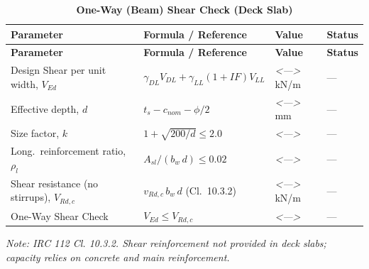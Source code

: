 \documentclass[12pt,a4paper]{report}
\numberwithin{table}{chapter}
\numberwithin{figure}{chapter}
\newcommand{\placeholder}[1]{\textit{\textless #1\textgreater}}
\begin{document}
\vspace{1em}
\begin{longtable}{|L{5.5cm}|C{3.5cm}|>{\centering\arraybackslash}p{4.5cm}|C{2cm}|}
\caption{\textbf{One-Way (Beam) Shear Check (Deck Slab)}}
\hline
{} \textbf{Parameter} & \textbf{Formula / Reference} & \textbf{Value} & \textbf{Status} \\[6pt]
\hline
\endfirsthead
\hline
{} \textbf{Parameter} & \textbf{Formula / Reference} & \textbf{Value} & \textbf{Status} \\[6pt]
\hline
\endhead
Design Shear per unit width, $V_{Ed}$ & $\gamma_{DL} V_{DL} + \gamma_{LL}(1{+}IF)V_{LL}$ & \placeholder{---} kN/m & --- \\[6pt]
\hline
Effective depth, $d$ & $t_s - c_{nom} - \phi/2$ & \placeholder{---} mm & --- \\[6pt]
\hline
Size factor, $k$ & $1 + \sqrt{200/d} \leq 2.0$ & \placeholder{---} & --- \\[6pt]
\hline
Long.\ reinforcement ratio, $\rho_l$ & $A_{sl}/(b_w\,d) \leq 0.02$ & \placeholder{---} & --- \\[6pt]
\hline
Shear resistance (no stirrups), $V_{Rd,c}$ & $v_{Rd,c}\,b_w\,d$ (Cl.\ 10.3.2) & \placeholder{---} kN/m & --- \\[6pt]
\hline
One-Way Shear Check & $V_{Ed} \leq V_{Rd,c}$ & \placeholder{---} & --- \\[6pt]
\hline
\end{longtable}
\noindent\textit{Note: IRC 112 Cl. 10.3.2. Shear reinforcement not provided in deck slabs; capacity relies on concrete and main reinforcement.}
\end{document}

